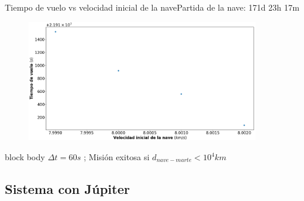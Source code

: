 \documentclass{beamer}
\begin{document}
            \begin{frame}{Tiempo de vuelo vs velocidad inicial de la nave}{Partida de la nave: 171d 23h 17m}
                \begin{figure}[H!]
                    \includegraphics[width=0.9\textwidth]{./time_vs_v0_for_v_less_10^4_scatter}
                    \label{fig:marte_11}
                \end{figure}
                \begin{beamercolorbox}[sep=5pt,center]{block body}
                    \centering
                    \small{$\Delta t = 60s$ ; Misión exitosa si $d_{nave-marte} < 10^4 km$}
                \end{beamercolorbox}
            \end{frame}

        \subsection{Sistema con Júpiter}
\end{document}
